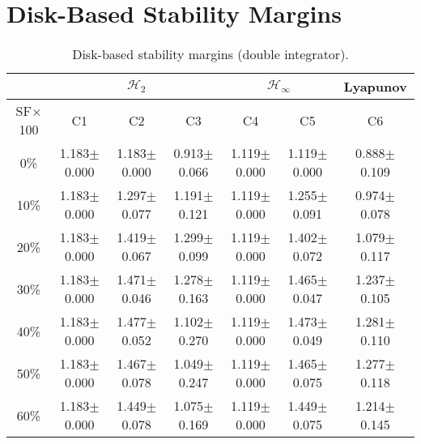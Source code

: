 \section{Disk-Based Stability Margins}
\begin{table}[H]
\centering
\scriptsize
\begin{tabular}{| c || c | c | c | c | c | c |}
	\hline
	 & \multicolumn{3}{c|}{$\mathcal{H}_{2}$} & \multicolumn{2}{c|}{$\mathcal{H}_{\infty}$} & Lyapunov\\
	\hline
	SF$\times$100 & C1& C2 & C3 & C4 & C5 & C6\\
	\hline\hline
	0\% & 1.183$\pm$0.000 & 1.183$\pm$0.000 & 0.913$\pm$0.066 & 1.119$\pm$0.000 & 1.119$\pm$0.000 & 0.888$\pm$0.109\\
	\hline
	10\% & 1.183$\pm$0.000 & 1.297$\pm$0.077 & 1.191$\pm$0.121 & 1.119$\pm$0.000 & 1.255$\pm$0.091 & 0.974$\pm$0.078\\
	\hline
	20\% & 1.183$\pm$0.000 & 1.419$\pm$0.067 & 1.299$\pm$0.099 & 1.119$\pm$0.000 & 1.402$\pm$0.072 & 1.079$\pm$0.117\\
	\hline
	30\% & 1.183$\pm$0.000 & 1.471$\pm$0.046 & 1.278$\pm$0.163 & 1.119$\pm$0.000 & 1.465$\pm$0.047 & 1.237$\pm$0.105\\
	\hline
	40\% & 1.183$\pm$0.000 & 1.477$\pm$0.052 & 1.102$\pm$0.270 & 1.119$\pm$0.000 & 1.473$\pm$0.049 & 1.281$\pm$0.110\\
	\hline
	50\% & 1.183$\pm$0.000 & 1.467$\pm$0.078 & 1.049$\pm$0.247 & 1.119$\pm$0.000 & 1.465$\pm$0.075 & 1.277$\pm$0.118\\
	\hline
	60\% & 1.183$\pm$0.000 & 1.449$\pm$0.078 & 1.075$\pm$0.169 & 1.119$\pm$0.000 & 1.449$\pm$0.075 & 1.214$\pm$0.145\\
	\hline
\end{tabular}
\caption{Disk-based stability margins (double integrator).}
\label{table:disk_margins_double_integrator:noise}
\end{table}

